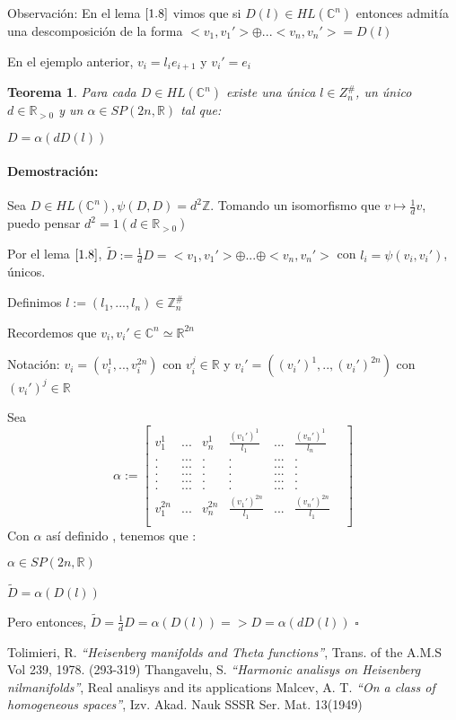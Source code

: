 \documentclass[12pt]{article}
\newtheorem{theorem}{Teorema}
\newenvironment{proof}{\paragraph{Demostración:}}{\hfill$\square$}
\begin{document}
 Observación: En el lema $\ref{1.8}$ vimos que si $D(l) \in HL(\mathbb{C}^n)$ entonces admitía una descomposición de la forma 
 $<v_1,v_1'>\oplus ... <v_n,v_n'>= D(l)$
 
 En el ejemplo anterior, $v_i=l_i e_{i+1}$ y $v_i'=e_i$
 

\begin{theorem}
 Para cada $D \in HL(\mathbb{C}^n)$ existe una única $l \in Z_n^{\#}$, un único $d \in \mathbb{R}_{>0}$ y un $\alpha \in SP(2n,\mathbb{R})$ tal que:
 
 $D=\alpha(d D(l))$
\end{theorem}

\begin{proof}
 Sea $D \in HL(\mathbb{C}^n), \psi(D,D)=d^2 \mathbb{Z}$. Tomando un isomorfismo que $v \mapsto \frac{1}{d} v$, puedo pensar $d^2=1 (d\in \mathbb{R}_{>0})$
 
 Por el lema $\ref{1.8}$, $\tilde{D}:= \frac{1}{d} D =  <v_1,v_1'> \oplus...\oplus <v_n,v_n'>$ con $l_i=\psi(v_i,v_i')$, únicos. 
 
 Definimos $l:=(l_1,...,l_n) \in \mathbb{Z}_n^{\#}$
 
 
 Recordemos que $v_i,v_i' \in \mathbb{C}^n \simeq \mathbb{R}^{2n}$
 
 Notación: $v_i=(v_i^1,..,v_i^{2n})$ con $v_i^j \in \mathbb{R}$ y $v_i'=((v_i')^1,..,(v_i')^{2n})$ con $(v_i')^j \in \mathbb{R}$
 
 Sea 
 $$\alpha:= \begin{bmatrix}
 v_1^1 & ... &v_n^1 & \frac{(v_1')^1}{l_1} &... &\frac{(v_n')^1}{l_n} &\\ 
 .& ... &. &. &... &. &\\
 .& ... &. &. &... &. &\\
 .& ... &. &. &... &. &\\
 .& ... &. &. &... &. &\\
 .& ... &. &. &... &. &\\
 v_1^{2n}&...&v_n^{2n} &\frac{(v_1')^{2n}}{l_1}  &...&\frac{(v_n')^{2n}}{l_1}  &\\ 
\end{bmatrix}
$$
Con $\alpha$ así definido , tenemos que :

$\alpha \in  SP(2n,\mathbb{R})$

$\tilde{D} = \alpha(D(l)) $

Pero entonces, $\tilde{D}=\frac{1}{d} D = \alpha(D(l)) => D=\alpha(d D(l))$
\end{proof}






 \newpage
  \begin{thebibliography}{1}
   Tolimieri, R.   \emph{``Heisenberg manifolds and Theta functions''}, Trans. of the A.M.S Vol 239, 1978. (293-319)
   Thangavelu, S.  \emph{``Harmonic analisys on Heisenberg nilmanifolds''}, Real analisys and its applications
   Malcev, A. T.  \emph{``On a class of homogeneous spaces''}, Izv. Akad. Nauk SSSR Ser. Mat. 13(1949)
  
  \end{thebibliography}
\end{document}
